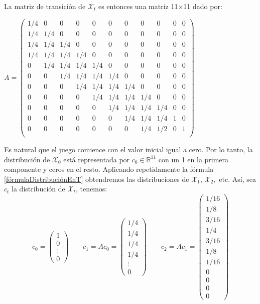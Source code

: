 \begin{exampleth}
La matriz de transición de $\mathcal{X}_t$ es entonces una matriz 11$\times$11 dado por:

\begin{center}
    $A=\begin{pmatrix}
    1/4 & 0 & 0 & 0 & 0 & 0 & 0 & 0 & 0 & 0 & 0 \\   
    1/4 & 1/4 & 0 & 0 & 0 & 0 & 0 & 0 & 0 & 0 & 0 \\
    1/4 & 1/4 & 1/4 & 0 & 0 & 0 & 0 & 0 & 0 & 0 & 0 \\
    1/4 & 1/4 & 1/4 & 1/4 & 0 & 0 & 0 & 0 & 0 & 0 & 0 \\
    0 & 1/4 & 1/4 & 1/4 & 1/4 & 0 & 0 & 0 & 0 & 0 & 0 \\
    0 & 0 & 1/4 & 1/4 & 1/4 & 1/4 & 0 & 0 & 0 & 0 & 0 \\
    0 & 0 & 0 & 1/4 & 1/4 & 1/4 & 1/4 & 0 & 0 & 0 & 0 \\
    0 & 0 & 0 & 0 & 1/4 & 1/4 & 1/4 & 1/4 & 0 & 0 & 0 \\
    0 & 0 & 0 & 0 & 0 & 1/4 & 1/4 & 1/4 & 1/4 & 0 & 0 \\
    0 & 0 & 0 & 0 & 0 & 0 & 1/4 & 1/4 & 1/4 & 1 & 0 \\
    0 & 0 & 0 & 0 & 0 & 0 & 0 & 1/4 & 1/2 & 0 & 1 \\
    \end{pmatrix}$
\end{center}

Es natural que el juego comience con el valor inicial igual a cero. Por lo tanto, la distribución de $\mathcal{X}_0$ está representada por $c_0\in\mathbb{R}^{11}$ con un 1 en la primera componente y ceros en el resto. Aplicando repetidamente la fórmula \ref{fórmulaDistribuciónEnT} obtendremos las distribuciones de $\mathcal{X}_1,\,\mathcal{X}_2,$ etc. Así, sea $c_t$ la distribución de $\mathcal{X}_t$, tenemos:
\[
c_0=\begin{pmatrix}
1\\ 0\\ \vdots \\ 0
\end{pmatrix}\qquad
c_1=Ac_0=\begin{pmatrix}
1/4\\ 1/4\\ 1/4\\ 1/4 \\ \vdots \\ 0
\end{pmatrix}\qquad
c_2=Ac_1=\begin{pmatrix}
1/16\\ 1/8 \\ 3/16\\ 1/4 \\ 3/16 \\ 1/8 \\ 1/16  \\ 0 \\ 0 \\ 0 \\ 0
\end{pmatrix}
\]


\end{exampleth}
